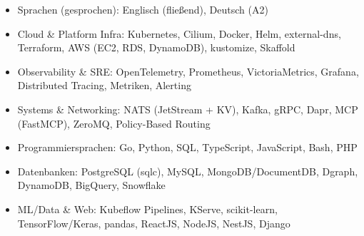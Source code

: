 \documentclass[10pt,a4paper]{resume}
\begin{document}
\begin{itemize}[leftmargin=1.4em,nosep,topsep=2pt]
  \item Sprachen (gesprochen): Englisch (fließend), Deutsch (A2)
  \item Cloud \& Platform Infra: Kubernetes, Cilium, Docker, Helm, external-dns, Terraform, AWS (EC2, RDS, DynamoDB), kustomize, Skaffold
  \item Observability \& SRE: OpenTelemetry, Prometheus, VictoriaMetrics, Grafana, Distributed Tracing, Metriken, Alerting
  \item Systems \& Networking: NATS (JetStream + KV), Kafka, gRPC, Dapr, MCP (FastMCP), ZeroMQ, Policy-Based Routing
  \item Programmiersprachen: Go, Python, SQL, TypeScript, JavaScript, Bash, PHP
  \item Datenbanken: PostgreSQL (sqlc), MySQL, MongoDB/DocumentDB, Dgraph, DynamoDB, BigQuery, Snowflake
  \item ML/Data \& Web: Kubeflow Pipelines, KServe, scikit-learn, TensorFlow/Keras, pandas, ReactJS, NodeJS, NestJS, Django
\end{itemize}
\end{document}
